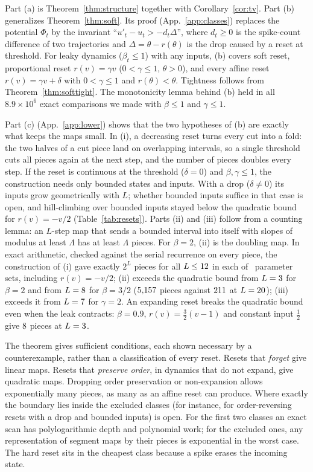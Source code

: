 \documentclass[10pt]{article}
\theoremstyle{remark}
\begin{document}
Part (a) is Theorem~\ref{thm:structure} together with Corollary~\ref{cor:tv}. Part (b) generalizes Theorem~\ref{thm:soft}. Its proof (App.~\ref{app:classes}) replaces the potential $\Phi_t$ by the invariant ``$u'_t-u_t>-d_t\Delta$'', where $d_t\ge0$ is the spike-count difference of two trajectories and $\Delta=\theta-r(\theta)$ is the drop caused by a reset at threshold. For leaky dynamics ($\beta_t\le1$) with any inputs, (b) covers soft reset, proportional reset $r(v)=\gamma v$ ($0<\gamma\le1$, $\theta>0$), and every affine reset $r(v)=\gamma v+\delta$ with $0<\gamma\le1$ and $r(\theta)<\theta$. Tightness follows from Theorem~\ref{thm:softtight}. The monotonicity lemma behind (b) held in all $8.9\times10^6$ exact comparisons we made with $\beta\le1$ and $\gamma\le1$.

Part (c) (App.~\ref{app:lower}) shows that the two hypotheses of (b) are exactly what keeps the maps small. In (i), a decreasing reset turns every cut into a fold: the two halves of a cut piece land on overlapping intervals, so a single threshold cuts all pieces again at the next step, and the number of pieces doubles every step. If the reset is continuous at the threshold ($\delta=0$) and $\beta,\gamma\le1$, the construction needs only bounded states and inputs. With a drop ($\delta\neq0$) its inputs grow geometrically with $L$; whether bounded inputs suffice in that case is open, and hill-climbing over bounded inputs stayed below the quadratic bound for $r(v)=-v/2$ (Table~\ref{tab:resets}). Parts (ii) and (iii) follow from a counting lemma: an $L$-step map that sends a bounded interval into itself with slopes of modulus at least $\Lambda$ has at least $\Lambda$ pieces. For $\beta=2$, (ii) is the doubling map. In exact arithmetic, checked against the serial recurrence on every piece, the construction of (i) gave exactly $2^L$ pieces for all $L\le12$ in each of \RevConfigs\ parameter sets, including $r(v)=-v/2$; (ii) exceeds the quadratic bound from $L=3$ for $\beta=2$ and from $L=8$ for $\beta=3/2$ ($5{,}157$ pieces against $211$ at $L=20$); (iii) exceeds it from $L=7$ for $\gamma=2$. An expanding reset breaks the quadratic bound even when the leak contracts: $\beta=0.9$, $r(v)=\tfrac32(v-1)$ and constant input $\tfrac12$ give $8$ pieces at $L=3$.

The theorem gives sufficient conditions, each shown necessary by a counterexample, rather than a classification of every reset. Resets that \emph{forget} give linear maps. Resets that \emph{preserve order}, in dynamics that do not expand, give quadratic maps. Dropping order preservation or non-expansion allows exponentially many pieces, as many as an affine reset can produce. Where exactly the boundary lies inside the excluded classes (for instance, for order-reversing resets with a drop and bounded inputs) is open. For the first two classes an exact scan has polylogarithmic depth and polynomial work; for the excluded ones, any representation of segment maps by their pieces is exponential in the worst case. The hard reset sits in the cheapest class because a spike erases the incoming state.
\end{document}
